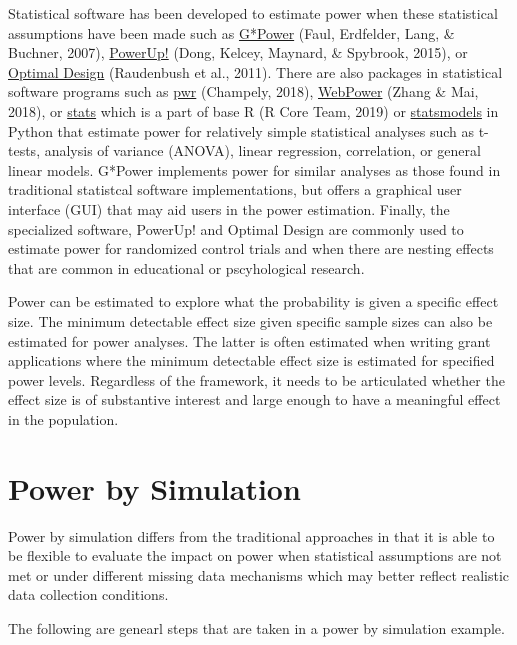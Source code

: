 \documentclass[man,mask,floatsintext]{apa6}
\begin{document}
Statistical software has been developed to estimate power when these statistical assumptions have been made such as \href{http://www.gpower.hhu.de/}{G*Power} (Faul, Erdfelder, Lang, \& Buchner, 2007), \href{https://www.causalevaluation.org/power-analysis.html}{PowerUp!} (Dong, Kelcey, Maynard, \& Spybrook, 2015), or \href{http://hlmsoft.net/od/}{Optimal Design} (Raudenbush et al., 2011). There are also packages in statistical software programs such as \href{https://cran.r-project.org/package=pwr}{pwr} (Champely, 2018), \href{https://cran.r-project.org/package=WebPower}{WebPower} (Zhang \& Mai, 2018), or \href{https://cran.r-project.org/package=STAT}{stats} which is a part of base R (R Core Team, 2019) or \href{http://www.statsmodels.org/}{statsmodels} in Python that estimate power for relatively simple statistical analyses such as t-tests, analysis of variance (ANOVA), linear regression, correlation, or general linear models. G*Power implements power for similar analyses as those found in traditional statistcal software implementations, but offers a graphical user interface (GUI) that may aid users in the power estimation. Finally, the specialized software, PowerUp! and Optimal Design are commonly used to estimate power for randomized control trials and when there are nesting effects that are common in educational or pscyhological research.

Power can be estimated to explore what the probability is given a specific effect size. The minimum detectable effect size given specific sample sizes can also be estimated for power analyses. The latter is often estimated when writing grant applications where the minimum detectable effect size is estimated for specified power levels. Regardless of the framework, it needs to be articulated whether the effect size is of substantive interest and large enough to have a meaningful effect in the population.

\hypertarget{power-by-simulation}{%
\section{Power by Simulation}\label{power-by-simulation}}

Power by simulation differs from the traditional approaches in that it is able to be flexible to evaluate the impact on power when statistical assumptions are not met or under different missing data mechanisms which may better reflect realistic data collection conditions.

The following are genearl steps that are taken in a power by simulation example.
\end{document}
